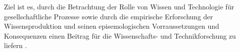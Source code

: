  Ziel ist es, durch die Betrachtung der Rolle von Wissen und Technologie für gesellschaftliche Prozesse sowie durch die empirische Erforschung der Wissensproduktion und seinen episemologischen Vorraussetzungen und Konsequenzen einen Beitrag für die Wissenschafts- und Technikforschung zu liefern \cite{beck_2014_science}.
